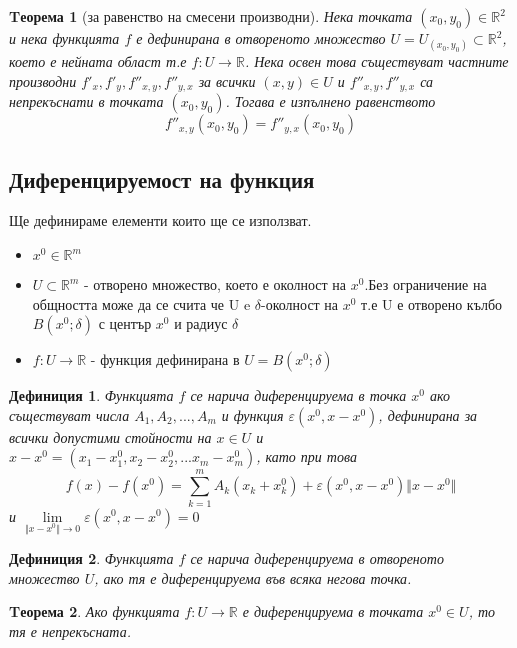 \documentclass[a4paper,fleqn,12pt]{article}
\newtheorem{theorem}{Tеорема}[subsection]
\newtheorem{definition}{Дефиниция}[subsection]
\begin{document}
\begin{theorem}[за равенство на смесени производни]
Нека точката $(x_0, y_0) \in \mathbb{R}^2$ и нека функцията $f$ е дефинирана в отвореното множество $U=U_{(x_0, y_0)} \subset \mathbb{R}^2$, което е нейната област т.е $f: U \to \mathbb{R}$. Нека освен това съществуват частните производни $f'_x, f'_y,f''_{x,y},f''_{y,x}$ за всички $(x, y)\in U$ и $f''_{x,y},f''_{y,x}$ са непрекъснати в точката $(x_0, y_0)$. Тогава е изпълнено равенството 
$$f''_{x,y}(x_0, y_0) = f''_{y,x}(x_0, y_0)$$
\end{theorem}

\subsection{Диференцируемост на функция}
Ще дефинираме елементи които ще се използват. 
\begin{itemize}
	\item $x^0 \in \mathbb{R}^m$
	\item $U \subset \mathbb{R}^m$ - отворено множество, което е околност на $x^0$.Без ограничение на общността може да се счита че U e $\delta$-околност на $x^0$ т.е U е отворено кълбо $B(x^0;\delta)$ с център $x^0$ и радиус $\delta$
	\item $f: U \to \mathbb{R}$ - функция дефинирана в $U = B(x^0;\delta) $
\end{itemize}

\begin{definition}
Функцията $f$ се нарича диференцируема в точка $x^0$ ако съществуват числа $A_1, A_2, ..., A_m$ и функция $\varepsilon (x^0, x - x^0)$, дефинирана за всички допустими стойности на $x \in U$ и $x - x^0 = (x_1 - x_1 ^0, x_2 - x_2 ^0,... x_m - x_m ^0)$, като при това 
$$f(x) - f(x^0) = \sum_{k=1}^{m} A_k(x_k + x_k ^ 0) + \varepsilon (x^0, x - x^0) \Vert x - x^0 \Vert$$ 
и $\lim\limits_{\Vert x - x^0 \Vert \to 0}\varepsilon (x^0, x - x^0) = 0$
\end{definition}

\begin{definition}
Функцията $f$ се нарича диференцируема в отвореното множество $U$, ако тя е диференцируема във всяка негова точка. 
\end{definition}

\begin{theorem}
Ако функцията $f: U \to \mathbb{R}$ е диференцируема в точката $x^0 \in U$, то тя е непрекъсната. 
\end{theorem}
\end{document}
